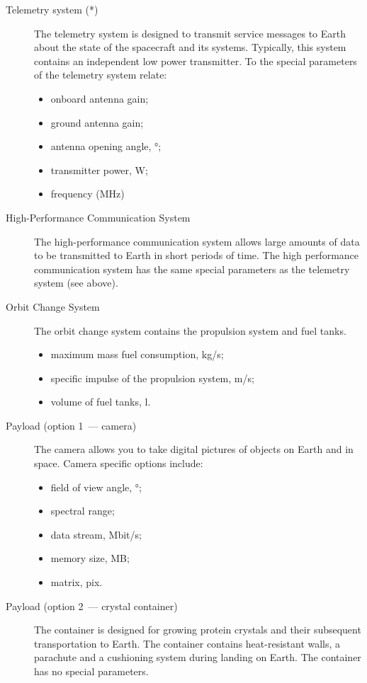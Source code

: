 \documentclass[12pt,a4paper]{article}
\begin{document}
\begin{description}
\item [Telemetry system (*)] The telemetry system is designed to transmit service messages to Earth about the state of the spacecraft and its systems. Typically, this system contains an independent low power transmitter. To the special parameters of the telemetry system
   relate:
   \begin{itemize}
   \item onboard antenna gain;
   \item ground antenna gain;
   \item antenna opening angle, °;
   \item transmitter power, W;
   \item frequency (MHz)
   \end{itemize}

\item [High-Performance Communication System] The high-performance communication system allows large amounts of data to be transmitted to Earth in short periods of time. The high performance communication system has the same special parameters as the telemetry system (see above).

\item [Orbit Change System] The orbit change system contains the propulsion system and fuel tanks.
   \begin{itemize}
     \item maximum mass fuel consumption, kg/s;
     \item specific impulse of the propulsion system, m/s;
     \item volume of fuel tanks, l.
   \end{itemize}

\item [Payload (option 1~--- camera)] The camera allows you to take digital pictures of objects on Earth and in space. Camera specific options include:
   \begin{itemize}
   \item field of view angle, °;
   \item spectral range;
   \item data stream, Mbit/s;
   \item memory size, MB;
   \item matrix, pix.
   \end{itemize}

\item [Payload (option 2~--- crystal container)] The container is designed for growing protein crystals and their subsequent transportation to Earth. The container contains heat-resistant walls, a parachute and a cushioning system during landing on Earth. The container has no special parameters.

\end{description}
\end{document}
